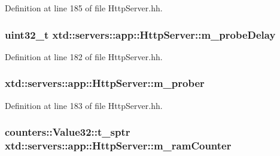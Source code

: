 Definition at line 185 of file Http\+Server.\+hh.

\subsubsection[{\texorpdfstring{m\+\_\+probe\+Delay}{m_probeDelay}}]{\setlength{\rightskip}{0pt plus 5cm}uint32\+\_\+t xtd\+::servers\+::app\+::\+Http\+Server\+::m\+\_\+probe\+Delay\hspace{0.3cm}{\ttfamily [protected]}}\hypertarget{classxtd_1_1servers_1_1app_1_1HttpServer_a87fc30b2e7e6ab2aabc2c46c884d7f17}{}\label{classxtd_1_1servers_1_1app_1_1HttpServer_a87fc30b2e7e6ab2aabc2c46c884d7f17}


Definition at line 182 of file Http\+Server.\+hh.

\subsubsection[{\texorpdfstring{m\+\_\+prober}{m_prober}}]{ xtd\+::servers\+::app\+::\+Http\+Server\+::m\+\_\+prober\hspace{0.3cm}{\ttfamily [protected]}}\hypertarget{classxtd_1_1servers_1_1app_1_1HttpServer_aa26ddc958ab07774e8ba45e89dc0011b}{}\label{classxtd_1_1servers_1_1app_1_1HttpServer_aa26ddc958ab07774e8ba45e89dc0011b}


Definition at line 183 of file Http\+Server.\+hh.

\subsubsection[{\texorpdfstring{m\+\_\+ram\+Counter}{m_ramCounter}}]{\setlength{\rightskip}{0pt plus 5cm}counters\+::\+Value32\+::t\+\_\+sptr xtd\+::servers\+::app\+::\+Http\+Server\+::m\+\_\+ram\+Counter\hspace{0.3cm}{\ttfamily [protected]}}\hypertarget{classxtd_1_1servers_1_1app_1_1HttpServer_a0758f122d486bc068d796d4ce550e99f}{}\label{classxtd_1_1servers_1_1app_1_1HttpServer_a0758f122d486bc068d796d4ce550e99f}


